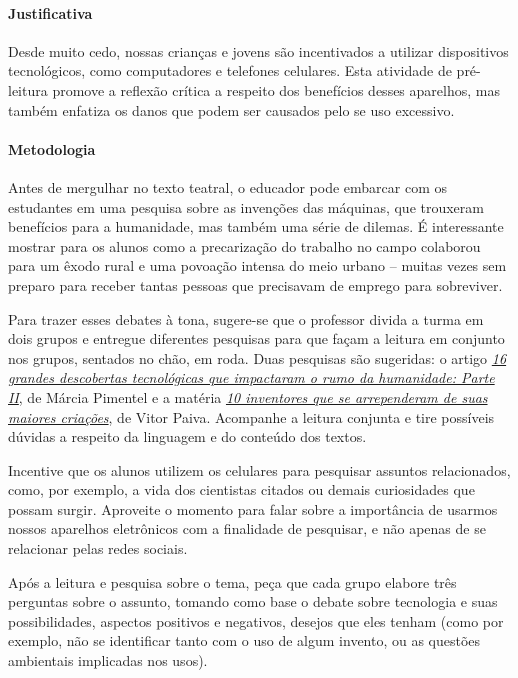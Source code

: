 \documentclass[11pt]{extarticle}
\begin{document}
\paragraph{Justificativa} Desde muito cedo, nossas crianças e jovens são incentivados a utilizar dispositivos tecnológicos, como computadores e telefones celulares. Esta atividade de pré-leitura promove a reflexão crítica a respeito dos benefícios desses aparelhos, mas também enfatiza os danos que podem ser causados pelo se uso excessivo.  

\paragraph{Metodologia} Antes de mergulhar no texto teatral, o educador pode embarcar com os estudantes em uma pesquisa sobre as invenções das máquinas, que trouxeram benefícios para a humanidade, mas também uma série de dilemas. É interessante mostrar para os alunos como a precarização do trabalho no campo colaborou para um êxodo rural e uma povoação intensa do meio urbano -- muitas vezes sem preparo para receber tantas pessoas que precisavam de emprego para sobreviver. 

Para trazer esses debates à tona, sugere-se que o professor divida a turma em dois grupos e entregue diferentes pesquisas para que façam a leitura em conjunto nos grupos, sentados no chão, em roda. Duas pesquisas são sugeridas: o artigo \href{http://multirio.rio.rj.gov.br/index.php/leia/reportagens-artigos/reportagens/16755-16-grandes-descobertas-tecnol\%C3\%B3gicas-que-impactaram-o-rumo-da-humanidade-parte-ii}{\textit{16 grandes descobertas tecnológicas que impactaram o rumo da humanidade: Parte II}}, de Márcia Pimentel e a matéria \href{https://www.hypeness.com.br/2017/03/selecao-hypeness-10-inventores-que-se-arrependeram-de-suas-maiores-criacoes/}{\textit{10 inventores que se arrependeram de suas maiores criações}}, de Vitor Paiva. Acompanhe a leitura conjunta e tire possíveis dúvidas a respeito da linguagem  e do conteúdo dos textos. 

Incentive que os alunos utilizem os celulares para pesquisar assuntos relacionados, como, por exemplo, a vida dos cientistas citados ou demais curiosidades que possam surgir. Aproveite o momento para falar sobre a importância de usarmos nossos aparelhos eletrônicos com a finalidade de pesquisar, e não apenas de se relacionar pelas redes sociais. 

Após a leitura e pesquisa sobre o tema, peça que cada grupo elabore três perguntas sobre o assunto, tomando como base o debate sobre tecnologia e suas possibilidades, aspectos positivos e negativos, desejos que eles tenham (como por exemplo, não se identificar tanto com o uso de algum invento, ou as questões ambientais implicadas nos usos). 
\end{document}
